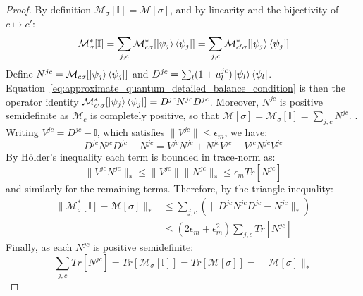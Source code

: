 \documentclass[aps,floatfix,10pt,amssymb,amsfont,amsmath,superscriptaddress,float,nofootinbib,longbibliography,nobalancelastpage,twocolumn]{revtex4-2}
\begin{document}
\begin{proof}
    By definition $\mathcal{M}_{\sigma}[\mathbb{I}] = \mathcal{M}[\sigma]$, and by linearity and the bijectivity of $c \mapsto c'$:
    \begin{equation}
        \mathcal{M}^*_{\sigma}[\mathbb{I}] = \sum_{j,c}\mathcal{M}^*_{c\sigma}[\ket{\psi_j}\bra{\psi_j}] = \sum_{j,c}\mathcal{M}^*_{c'\sigma}[\ket{\psi_j}\bra{\psi_j}]
    \end{equation}
    Define $N^{jc} = \mathcal{M}_{c\sigma}[\ket{\psi_j}\bra{\psi_j}]$ and $D^{jc}=\sum_l(1+u_l^{jc})\ket{\psi_l}\bra{\psi_l}$. Equation~\eqref{eq:approximate_quantum_detailed_balance_condition} is then the operator identity $\mathcal{M}^*_{c'\sigma}[\ket{\psi_j}\bra{\psi_j}]=D^{jc}N^{jc}D^{jc}$. Moreover, $N^{jc}$ is positive semidefinite as $\mathcal{M}_c$ is completely positive, so that $\mathcal{M}[\sigma] = \mathcal{M}_{\sigma}[\mathbb{I}] = \sum_{j,c}N^{jc}$. . Writing $V^{jc} = D^{jc}-\mathbb{I}$, which satisfies $\|V^{jc}\|\leq\epsilon_m$, we have:
    \begin{equation}
        D^{jc}N^{jc}D^{jc} - N^{jc} = V^{jc}N^{jc} + N^{jc}V^{jc} + V^{jc}N^{jc}V^{jc}
    \end{equation}
    By H\"older's inequality each term is bounded in trace-norm as:
    \begin{equation}
        \|V^{jc}N^{jc}\|_* \leq \|V^{jc}\|\|N^{jc}\|_* \leq \epsilon_m Tr[N^{jc}]
    \end{equation}
    and similarly for the remaining terms. Therefore, by the triangle inequality:
    \begin{align}
        \|\mathcal{M}^*_{\sigma}[\mathbb{I}]-\mathcal{M}[\sigma]\|_* &\leq \sum_{j,c}\left(\|D^{jc}N^{jc}D^{jc}-N^{jc}\|_*\right)\\
        &\leq (2\epsilon_m+\epsilon_m^2)\sum_{j,c}Tr[N^{jc}] 
    \end{align}
    Finally, as each $N^{jc}$ is positive semidefinite:
    \begin{equation}
        \sum_{j,c}Tr[N^{jc}] = Tr[\mathcal{M}_{\sigma}[\mathbb{I}]] = Tr[\mathcal{M}[\sigma]] = \|\mathcal{M}[\sigma]\|_*
    \end{equation}
\end{proof}
\end{document}
